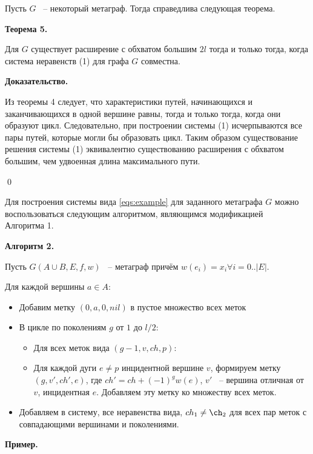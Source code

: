 \documentclass[14pt]{mmcs-article}
\begin{document}
Пусть $G$ ~-- некоторый метаграф. Тогда справедлива следующая теорема.

\textbf{Теорема 5.}

Для $G$ существует расширение с обхватом большим $2l$  тогда и только тогда, когда система неравенств (1) для графа $G$ совместна.

\textbf{Доказательство.}

Из теоремы 4 следует, что характеристики путей, начинающихся и заканчивающихся в одной вершине равны, тогда и только тогда, когда они образуют цикл. Следовательно, при построении системы (1) исчерпываются все пары путей, которые могли бы образовать цикл. Таким образом существование решения системы (1) эквивалентно существованию расширения с обхватом большим, чем удвоенная длина максимального пути.

\qed

Для построения системы вида \ref{eqs:example} для заданного метаграфа $G$ можно воспользоваться следующим алгоритмом, являющимся модификацией\\ Алгоритма 1.

\textbf{Алгоритм 2.}

Пусть $G(A \cup B, E, f, w)$ ~-- метаграф причём $w(e_i) = x_i \forall i = 0..|E|$.

Для каждой вершины $a \in A$:

\begin{itemize}
    \item Добавим метку $(0, a, 0, nil)$ в пустое множество всех меток
    \item В цикле по поколениям $g$ от $1$ до $l / 2$:
    \begin{itemize}
        \item Для всех меток вида $(g - 1, v, ch, p)$:
        \item
            Для каждой дуги $e \not= p$ инцидентной вершине $v$,
            формируем метку $(g, v', ch', e)$, где $ch' = ch + (-1)^{g} w(e)$, $v'$ ~-- вершина отличная от $v$, инцидентная $e$.
            Добавляем эту метку ко множеству всех меток.
    \end{itemize}
    \item Добавляем в систему, все неравенства вида, $ch_1 \neq \ch_2$ для всех пар меток с совпадающими вершинами и поколениями.
\end{itemize}

\textbf{Пример.}
\end{document}
